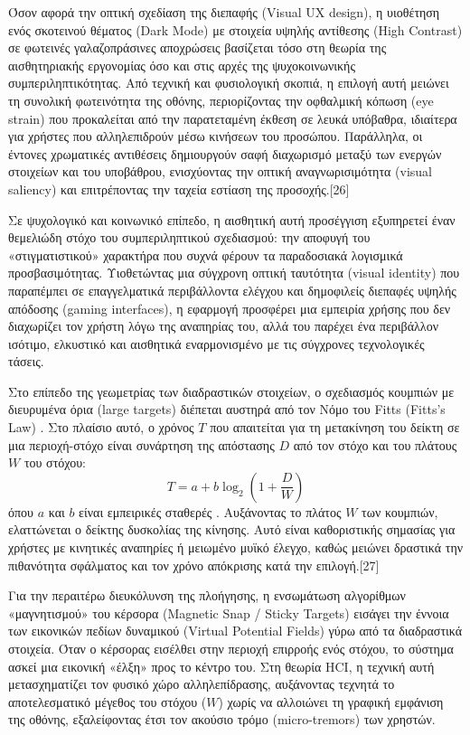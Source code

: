 \documentclass[twoside, a4paper, 11pt]{article}
\newcommand{\textlatin}[1]{\textenglish{#1}}
\begin{document}
Όσον αφορά την οπτική σχεδίαση της διεπαφής (\textlatin{Visual UX design}), η υιοθέτηση ενός σκοτεινού θέματος (\textlatin{Dark Mode}) με στοιχεία υψηλής αντίθεσης (\textlatin{High Contrast}) σε φωτεινές γαλαζοπράσινες 
αποχρώσεις βασίζεται τόσο στη θεωρία της αισθητηριακής εργονομίας όσο και στις αρχές της ψυχοκοινωνικής συμπεριληπτικότητας. Από τεχνική και φυσιολογική σκοπιά, η επιλογή αυτή μειώνει τη συνολική φωτεινότητα της οθόνης, 
περιορίζοντας την οφθαλμική κόπωση (\textlatin{eye strain}) που προκαλείται από την παρατεταμένη έκθεση σε λευκά υπόβαθρα, ιδιαίτερα για χρήστες που αλληλεπιδρούν μέσω κινήσεων του προσώπου. Παράλληλα, οι έντονες χρωματικές αντιθέσεις 
δημιουργούν σαφή διαχωρισμό μεταξύ των ενεργών στοιχείων και του υποβάθρου, ενισχύοντας την οπτική αναγνωρισιμότητα (\textlatin{visual saliency}) και επιτρέποντας την ταχεία εστίαση της προσοχής.[26]

Σε ψυχολογικό και κοινωνικό επίπεδο, η αισθητική αυτή προσέγγιση εξυπηρετεί έναν θεμελιώδη στόχο του συμπεριληπτικού σχεδιασμού: την αποφυγή του «στιγματιστικού» χαρακτήρα που συχνά φέρουν τα παραδοσιακά λογισμικά προσβασιμότητας. 
Υιοθετώντας μια σύγχρονη οπτική ταυτότητα (\textlatin{visual identity}) που παραπέμπει σε επαγγελματικά περιβάλλοντα ελέγχου και δημοφιλείς διεπαφές υψηλής απόδοσης (\textlatin{gaming interfaces}), 
η εφαρμογή προσφέρει μια εμπειρία χρήσης που δεν διαχωρίζει τον χρήστη λόγω της αναπηρίας του, αλλά του παρέχει ένα περιβάλλον ισότιμο, ελκυστικό και αισθητικά εναρμονισμένο με τις σύγχρονες τεχνολογικές τάσεις.

Στο επίπεδο της γεωμετρίας των διαδραστικών στοιχείων, ο σχεδιασμός κουμπιών με διευρυμένα όρια (\textlatin{large targets}) διέπεται αυστηρά από τον Νόμο του \textlatin{Fitts} (\textlatin{Fitts's Law}) \cite{fitts1954information, soukoreff2004fitts}. Στο πλαίσιο αυτό, ο χρόνος $T$ που απαιτείται για τη μετακίνηση του δείκτη σε μια περιοχή-στόχο είναι συνάρτηση της απόστασης $D$ από τον στόχο και του πλάτους $W$ του στόχου:
\begin{equation}
T = a + b \log_2 \left(1 + \frac{D}{W}\right)
\end{equation}
όπου $a$ και $b$ είναι εμπειρικές σταθερές \cite{soukoreff2004fitts}. Αυξάνοντας το πλάτος $W$ των κουμπιών, ελαττώνεται ο δείκτης δυσκολίας της κίνησης. Αυτό είναι καθοριστικής σημασίας για χρήστες με κινητικές αναπηρίες ή μειωμένο μυϊκό έλεγχο, καθώς μειώνει δραστικά την πιθανότητα σφάλματος και τον χρόνο απόκρισης κατά την επιλογή.[27]

Για την περαιτέρω διευκόλυνση της πλοήγησης, η ενσωμάτωση αλγορίθμων «μαγνητισμού» του κέρσορα (\textlatin{Magnetic Snap / Sticky Targets}) εισάγει την έννοια των εικονικών πεδίων δυναμικού (\textlatin{Virtual Potential Fields}) γύρω από τα διαδραστικά στοιχεία. 
Όταν ο κέρσορας εισέλθει στην περιοχή επιρροής ενός στόχου, το σύστημα ασκεί μια εικονική «έλξη» προς το κέντρο του. Στη θεωρία HCI, η τεχνική αυτή μετασχηματίζει τον φυσικό χώρο αλληλεπίδρασης, αυξάνοντας τεχνητά το αποτελεσματικό μέγεθος του στόχου ($W$) χωρίς να αλλοιώνει τη γραφική 
εμφάνιση της οθόνης, εξαλείφοντας έτσι τον ακούσιο τρόμο (\textlatin{micro-tremors}) των χρηστών.
\end{document}
